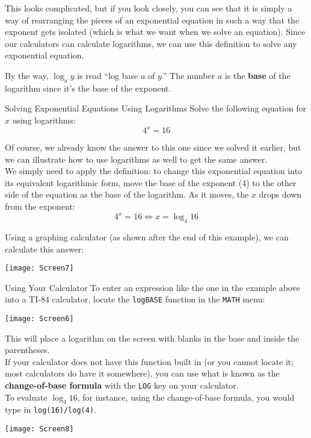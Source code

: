 This looks complicated, but if you look closely, you can see that it is simply a way of rearranging the pieces of an exponential equation in such a way that the exponent gets isolated (which is what we want when we solve an equation).  Since our calculators can calculate logarithms, we can use this definition to solve any exponential equation.

By the way, $\log_a y$ is read ``log base $a$ of $y$.''  The number $a$ is the \textbf{base} of the logarithm since it's the base of the exponent.

\begin{example}{Solving Exponential Equations Using Logarithms}
Solve the following equation for $x$ using logarithms:
\[4^x = 16\]

\sol
Of course, we already know the answer to this one since we solved it earlier, but we can illustrate how to use logarithms as well to get the same answer.\\

We simply need to apply the definition: to change this exponential equation into its equivalent logarithmic form, move the base of the exponent (4) to the other side of the equation as the base of the logarithm.  As it moves, the $x$ drops down from the exponent:
\[4^x = 16 \iff x = \log_4 16\]

Using a graphing calculator (as shown after the end of this example), we can calculate this answer:
\begin{center}
\texttt{[image: Screen7]}
\end{center}
\end{example}

\begin{proc}{Using Your Calculator}
To enter an expression like the one in the example above into a TI-84 calculator, locate the \verb|logBASE| function in the \verb|MATH| menu:
\begin{center}
\texttt{[image: Screen6]}
\end{center}
This will place a logarithm on the screen with blanks in the base and inside the parentheses.\\

If your calculator does not have this function built in (or you cannot locate it; most calculators do have it somewhere), you can use what is known as the \textbf{change-of-base formula} with the \verb|LOG| key on your calculator.\\

To evaluate $\log_4 16$, for instance, using the change-of-base formula, you would type in \verb|log(16)/log(4)|.
\begin{center}
\texttt{[image: Screen8]}
\end{center}
\end{proc}


